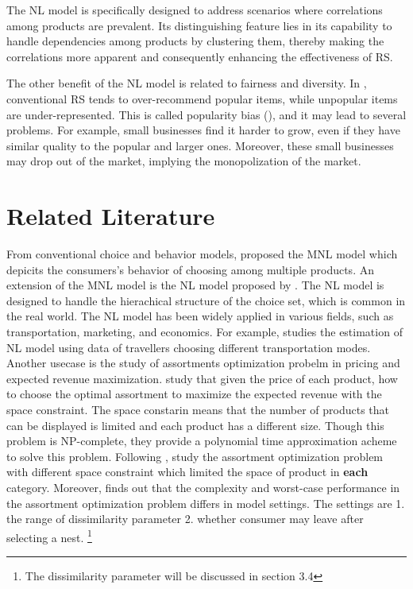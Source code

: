 \documentclass[12pt]{article}
\theoremstyle{definition}
\begin{document}
\begin{sloppypar}
The NL model is specifically designed to address scenarios where correlations among products are prevalent. Its distinguishing feature lies in its capability to handle dependencies among products by clustering them, thereby making the correlations more apparent and consequently enhancing the effectiveness of RS.

The other benefit of the NL model is related to fairness and diversity. In \textcite{zhao2024}, conventional RS tends to over-recommend popular items, while unpopular items are under-represented. This is called popularity bias (\textcite{DBLP:journals/corr/abs-1907-13286}), and it may lead to several problems. For example, small businesses find it harder to grow, even if they have similar quality to the popular and larger ones. Moreover, these small businesses may drop out of the market, implying the monopolization of the market.
\section{Related Literature}
From conventional choice and behavior models, \textcite{mcfadden1972} proposed the MNL model which depicits the consumers's behavior of choosing among multiple products. An extension of the MNL model is the NL model proposed by \textcite{williams1977}. The NL model is designed to handle the hierachical structure of the choice set, which is common in the real world. The NL model has been widely applied in various fields, such as transportation, marketing, and economics. For example, \textcite{hensher2002} studies the estimation of NL model using data of travellers choosing different transportation modes. Another usecase is the study of assortments optimization probelm in pricing and expected revenue maximization. \textcite{rusmevichientong2009} study that given the price of each product, how to choose the optimal assortment to maximize the expected revenue with the space constraint. The space constarin means that the number of products that can be displayed is limited and each product has a different size. Though this problem is NP-complete, they provide a polynomial time approximation acheme to solve this problem. Following \textcite{rusmevichientong2009}, \textcite{gallego2014} study the assortment optimization problem with different space constraint which limited the space of product in \textbf{each} category. Moreover, \textcite{davis2014} finds out that the complexity and worst-case performance in the assortment optimization problem differs in model settings. The settings are 1. the range of dissimilarity parameter 2. whether consumer may leave after selecting a nest. \footnote{The dissimilarity parameter will be discussed in section 3.4}


\end{sloppypar}
\end{document}
